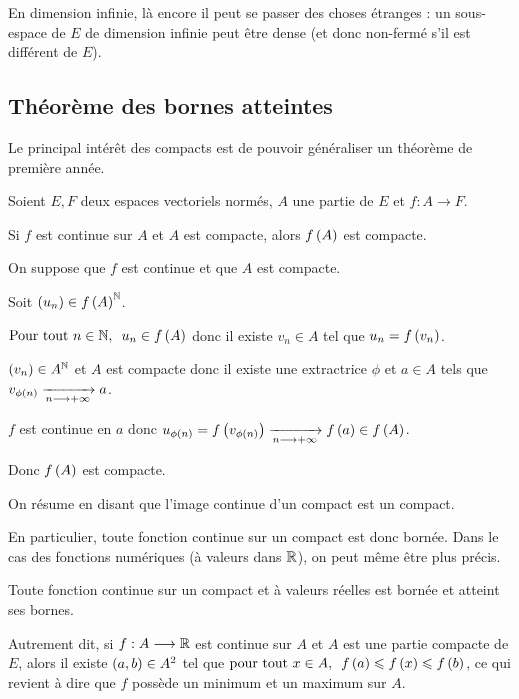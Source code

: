 En dimension infinie, là encore il peut se passer des choses étranges : un sous-espace de \(E\) de dimension infinie peut être dense (et donc non-fermé s'il est différent de \(E\)).

\subsection{Théorème des bornes atteintes}

Le principal intérêt des compacts est de pouvoir généraliser un théorème de première année.

\begin{theo}
Soient \(E,F\) deux espaces vectoriels normés, \(A\) une partie de \(E\) et \(f:A\to F\).

Si \(f\) est continue sur \(A\) et \(A\) est compacte, alors \(f\left(A\right)\) est compacte.
\end{theo}

\begin{dem}
On suppose que \(f\) est continue et que \(A\) est compacte.

Soit \(\left(u_n\right)\in f\left(A\right)^{\mathbb{N}}\).

\(\quantifs{\Tpt n\in\N}u_n\in f\paren{A}\) donc il existe \(v_n\in A\) tel que \(u_n=f\left(v_n\right)\).

\(\left(v_n\right)\in A^{\mathbb{N}}\) et \(A\) est compacte donc il existe une extractrice \(\phi\) et \(a\in A\) tels que \(v_{\phi\left(n\right)}\xrightarrow[n\longrightarrow+\infty]{}a\).

\(f\) est continue en \(a\) donc \(u_{\phi\left(n\right)}=f\left(v_{\phi\left(n\right)}\right)\xrightarrow[n\longrightarrow+\infty]{}f\left(a\right)\in f\left(A\right)\).

Donc \(f\left(A\right)\) est compacte.
\end{dem}

On résume en disant que l'image continue d'un compact est un compact.

En particulier, toute fonction continue sur un compact est donc bornée. Dans le cas des fonctions numériques (\ie à valeurs dans \(\mathbb{R}\)), on peut même être plus précis.

\begin{theo}
Toute fonction continue sur un compact et à valeurs réelles est bornée et atteint ses bornes.

Autrement dit, si \(f:A\longrightarrow\mathbb{R}\) est continue sur \(A\) et \(A\) est une partie compacte de \(E\), alors il existe \(\left(a,b\right)\in A^2\) tel que \(\quantifs{\tpt x\in A}f\paren{a}\leq f\paren{x}\leq f\paren{b}\), ce qui revient à dire que \(f\) possède un minimum et un maximum sur \(A\).
\end{theo}

